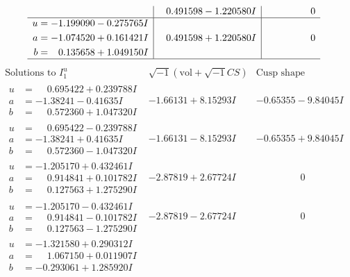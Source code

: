 \documentclass[1p]{elsarticle_modified}
\theoremstyle{definition}
\newcommand{\I}{\sqrt{-1}}
\begin{document}
$$\begin{array}{c|c|c}
 & \phantom{-}0.491598 - 1.220580 I & \phantom{-0.000000 } 0 \\ \hline\begin{aligned}
u &= -1.199090 - 0.275765 I \\
a &= -1.074520 + 0.161421 I \\
b &= \phantom{-}0.135658 + 1.049150 I\end{aligned}
 & \phantom{-}0.491598 + 1.220580 I & \phantom{-0.000000 } 0\\
 \hline 
 \end{array}$$\newpage$$\begin{array}{c|c|c}  
\text{Solutions to }I^u_{1}& \I (\text{vol} + \sqrt{-1}CS) & \text{Cusp shape}\\
 \hline 
\begin{aligned}
u &= \phantom{-}0.695422 + 0.239788 I \\
a &= -1.38241 - 0.41635 I \\
b &= \phantom{-}0.572360 + 1.047320 I\end{aligned}
 & -1.66131 + 8.15293 I & -0.65355 - 9.84045 I \\ \hline\begin{aligned}
u &= \phantom{-}0.695422 - 0.239788 I \\
a &= -1.38241 + 0.41635 I \\
b &= \phantom{-}0.572360 - 1.047320 I\end{aligned}
 & -1.66131 - 8.15293 I & -0.65355 + 9.84045 I \\ \hline\begin{aligned}
u &= -1.205170 + 0.432461 I \\
a &= \phantom{-}0.914841 + 0.101782 I \\
b &= \phantom{-}0.127563 + 1.275290 I\end{aligned}
 & -2.87819 + 2.67724 I & \phantom{-0.000000 } 0 \\ \hline\begin{aligned}
u &= -1.205170 - 0.432461 I \\
a &= \phantom{-}0.914841 - 0.101782 I \\
b &= \phantom{-}0.127563 - 1.275290 I\end{aligned}
 & -2.87819 - 2.67724 I & \phantom{-0.000000 } 0 \\ \hline\begin{aligned}
u &= -1.321580 + 0.290312 I \\
a &= \phantom{-}1.067150 + 0.011907 I \\
b &= -0.293061 + 1.285920 I\end{aligned}

\end{array}$$
\end{document}

